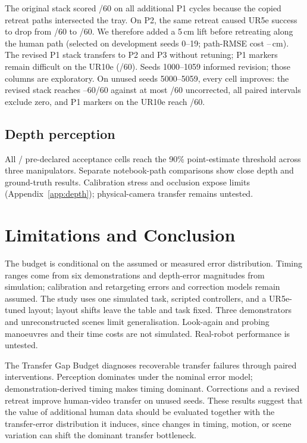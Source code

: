 \documentclass{article}
\begin{document}
The original stack scored \dmVOneMax/60 on all \dmVOneDemos{} additional P1 cycles because the copied retreat paths intersected the tray. On P2, the same retreat caused UR5e success to drop from \dmVFourRaw/60 to \dmVFourStack/60.
We therefore added a 5\,cm lift before retreating along the human path (selected on development seeds 0--19; path-RMSE cost \dmCostMin--\dmCostMax\,cm).
The revised P1 stack transfers to P2 and P3 without retuning; P1 markers remain difficult on the UR10e (\dmMarkersTenStack/60).
Seeds 1000--1059 informed revision; those columns are exploratory. On unused seeds 5000--5059, every cell improves: the revised stack reaches \frStackMin--60/60 against at most \frRawMax/60 uncorrected,
all paired intervals exclude zero, and P1 markers on the UR10e reach \frMarkersTenStack/60.

\subsection{Depth perception}

All \pcBarMet/\pcBarCells{} pre-declared acceptance cells reach the 90\% point-estimate threshold across three manipulators. Separate notebook-path comparisons show close depth and ground-truth results. Calibration stress and occlusion expose limits (Appendix~\ref{app:depth}); physical-camera transfer remains untested.

\section{Limitations and Conclusion}
\label{sec:limits}

The budget is conditional on the assumed or measured error distribution. Timing ranges come from six demonstrations and depth-error magnitudes from simulation; calibration and retargeting errors and correction models remain assumed. The study uses one simulated task, scripted controllers, and a UR5e-tuned layout; layout shifts leave the table and task fixed. Three demonstrators and unreconstructed scenes limit generalisation. Look-again and probing manoeuvres and their time costs are not simulated. Real-robot performance is untested.

The Transfer Gap Budget diagnoses recoverable transfer failures through paired interventions. Perception dominates under the nominal error model; demonstration-derived timing makes timing dominant. Corrections and a revised retreat improve human-video transfer on unused seeds. These results suggest that the value of additional human data should be evaluated together with the transfer-error distribution it induces, since changes in timing, motion, or scene variation can shift the dominant transfer bottleneck.
\end{document}
